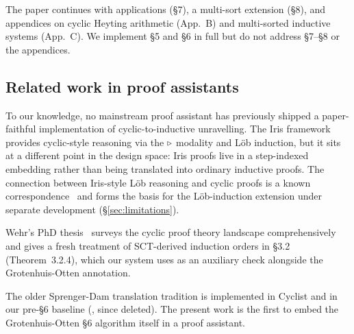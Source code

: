 The paper continues with applications (§7), a multi-sort extension (§8), and
appendices on cyclic Heyting arithmetic (App.~B) and multi-sorted inductive
systems (App.~C). We implement §5 and §6 in full but do not address §7--§8
or the appendices.

\subsection{Related work in proof assistants}

To our knowledge, no mainstream proof assistant has previously shipped a
paper-faithful implementation of cyclic-to-inductive unravelling. The Iris
framework~\cite{jung2015iris} provides cyclic-style reasoning via the
\(\triangleright\) modality and Löb induction, but it sits at a different point in
the design space: Iris proofs live in a step-indexed embedding rather than
being translated into ordinary inductive proofs. The connection between
Iris-style Löb reasoning and cyclic proofs is a known
correspondence~\cite{simpson2017cyclic, berardi2017intuitionistic} and forms
the basis for the Löb-induction extension under separate development
(§\ref{sec:limitations}).

Wehr's PhD thesis~\cite{wehr2025cyclic} surveys the cyclic proof theory
landscape comprehensively and gives a fresh treatment of SCT-derived
induction orders in §3.2 (Theorem~3.2.4), which our system uses as an
auxiliary check alongside the Grotenhuis-Otten annotation.

The older Sprenger-Dam translation tradition is implemented in Cyclist and
in our pre-§6 baseline (, since deleted). The
present work is the first to embed the Grotenhuis-Otten §6 algorithm itself
in a proof assistant.
